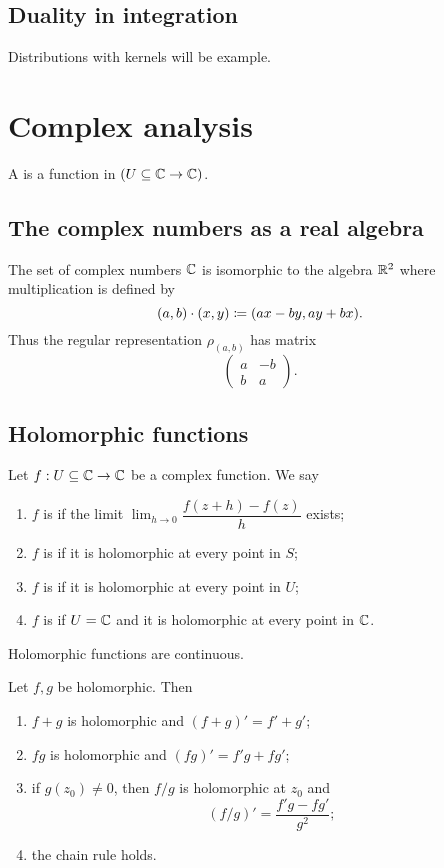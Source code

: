 \section{Duality in integration}
Distributions with kernels will be example.

\chapter{Complex analysis}
\begin{definition}
A  is a function in $(U\subseteq \mathbb{C} \to \mathbb{C})$.
\end{definition}
\section{The complex numbers as a real algebra}
The set of complex numbers $\mathbb{C}$ is isomorphic to the algebra $\mathbb{R}^2$ where multiplication is defined by
\[ (a, b)\cdot (x, y) \coloneqq (ax-by, ay+bx). \]
Thus the regular representation $\rho_{(a,b)}$ has matrix
\[ \begin{pmatrix}
a & -b \\ b & a
\end{pmatrix}. \]

\section{Holomorphic functions}
\begin{definition}
Let $f:U\subseteq \mathbb{C} \to \mathbb{C}$ be a complex function. We say
\begin{enumerate}
\item $f$ is  if the limit $\lim_{h\to 0} \dfrac{f(z+h) - f(z)}{h}$
exists;
\item $f$ is  if it is holomorphic at every point in $S$;
\item $f$ is  if it is holomorphic at every point in $U$;
\item $f$ is  if $U=\mathbb{C}$ and it is holomorphic at every point in $\mathbb{C}$.
\end{enumerate}
\end{definition}

\begin{lemma}
Holomorphic functions are continuous.
\end{lemma}
\begin{lemma}
Let $f,g$ be holomorphic. Then
\begin{enumerate}
\item $f+g$ is holomorphic and $(f+g)' = f'+g'$;
\item $fg$ is holomorphic and $(fg)' = f'g+fg'$;
\item if $g(z_0)\neq 0$, then $f/g$ is holomorphic at $z_0$ and
\[ (f/g)' = \frac{f'g - fg'}{g^2}; \]
\item the chain rule holds.
\end{enumerate}
\end{lemma}

